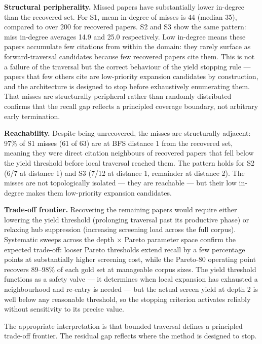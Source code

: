 \documentclass[manuscript,review,anonymous]{acmart}
\begin{document}
\textbf{Structural peripherality.} Missed papers have substantially lower in-degree than
the recovered set. For S1, mean in-degree of misses is 44 (median 35), compared to over 200
for recovered papers. S2 and S3 show the same pattern: miss in-degree averages 14.9 and
25.0 respectively. Low in-degree means these papers accumulate few citations from within
the domain: they rarely surface as forward-traversal candidates because few recovered papers
cite them. This is not a failure of the traversal but the correct behaviour of the yield
stopping rule --- papers that few others cite are low-priority expansion candidates by
construction, and the architecture is designed to stop before exhaustively enumerating them.
That misses are structurally peripheral rather than randomly distributed confirms that the
recall gap reflects a principled coverage boundary, not arbitrary early termination.

\textbf{Reachability.} Despite being unrecovered, the misses are structurally adjacent:
97\% of S1 misses (61 of 63) are at BFS distance 1 from the recovered set, meaning they
were direct citation neighbours of recovered papers that fell below the yield threshold
before local traversal reached them. The pattern holds for S2 (6/7 at distance 1) and
S3 (7/12 at distance 1, remainder at distance 2). The misses are not topologically
isolated --- they are reachable --- but their low in-degree makes them low-priority
expansion candidates.

\textbf{Trade-off frontier.} Recovering the remaining papers would require either lowering
the yield threshold (prolonging traversal past its productive phase) or relaxing hub
suppression (increasing screening load across the full corpus). Systematic sweeps across
the depth $\times$ Pareto parameter space confirm the expected trade-off: looser Pareto
thresholds extend recall by a few percentage points at substantially higher screening cost,
while the Pareto-80 operating point recovers 89--98\% of each gold set at manageable
corpus sizes. The yield threshold functions as a safety valve --- it determines when local
expansion has exhausted a neighbourhood and re-entry is needed --- but the actual screen
yield at depth 2 is well below any reasonable threshold, so the stopping criterion
activates reliably without sensitivity to its precise value.

The appropriate interpretation is that bounded traversal defines a principled trade-off
frontier. The residual gap reflects where the method is designed to stop.
\end{document}
